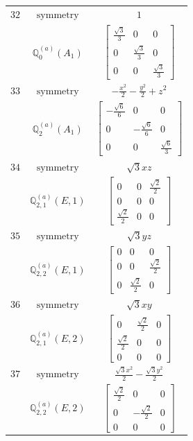 \documentclass[fleqn,8pt,landscape]{jsarticle}
\begin{document}
\begin{longtable}{ccc}
$ 32 $ & $ \text{symmetry} $ & $ 1 $ \\
$  $ & $ \mathbb{Q}_{0}^{(a)}(A_{1}) $ & $ \begin{bmatrix} \frac{\sqrt{3}}{3} & 0 & 0 \\ 0 & \frac{\sqrt{3}}{3} & 0 \\ 0 & 0 & \frac{\sqrt{3}}{3} \end{bmatrix} $ \\ \hline
$ 33 $ & $ \text{symmetry} $ & $ - \frac{x^{2}}{2} - \frac{y^{2}}{2} + z^{2} $ \\
$  $ & $ \mathbb{Q}_{2}^{(a)}(A_{1}) $ & $ \begin{bmatrix} - \frac{\sqrt{6}}{6} & 0 & 0 \\ 0 & - \frac{\sqrt{6}}{6} & 0 \\ 0 & 0 & \frac{\sqrt{6}}{3} \end{bmatrix} $ \\ \hline
$ 34 $ & $ \text{symmetry} $ & $ \sqrt{3} x z $ \\
$  $ & $ \mathbb{Q}_{2,1}^{(a)}(E,1) $ & $ \begin{bmatrix} 0 & 0 & \frac{\sqrt{2}}{2} \\ 0 & 0 & 0 \\ \frac{\sqrt{2}}{2} & 0 & 0 \end{bmatrix} $ \\ \hline
$ 35 $ & $ \text{symmetry} $ & $ \sqrt{3} y z $ \\
$  $ & $ \mathbb{Q}_{2,2}^{(a)}(E,1) $ & $ \begin{bmatrix} 0 & 0 & 0 \\ 0 & 0 & \frac{\sqrt{2}}{2} \\ 0 & \frac{\sqrt{2}}{2} & 0 \end{bmatrix} $ \\ \hline
$ 36 $ & $ \text{symmetry} $ & $ \sqrt{3} x y $ \\
$  $ & $ \mathbb{Q}_{2,1}^{(a)}(E,2) $ & $ \begin{bmatrix} 0 & \frac{\sqrt{2}}{2} & 0 \\ \frac{\sqrt{2}}{2} & 0 & 0 \\ 0 & 0 & 0 \end{bmatrix} $ \\ \hline
$ 37 $ & $ \text{symmetry} $ & $ \frac{\sqrt{3} x^{2}}{2} - \frac{\sqrt{3} y^{2}}{2} $ \\
$  $ & $ \mathbb{Q}_{2,2}^{(a)}(E,2) $ & $ \begin{bmatrix} \frac{\sqrt{2}}{2} & 0 & 0 \\ 0 & - \frac{\sqrt{2}}{2} & 0 \\ 0 & 0 & 0 \end{bmatrix} $ \\ \hline

\end{longtable}
\end{document}
